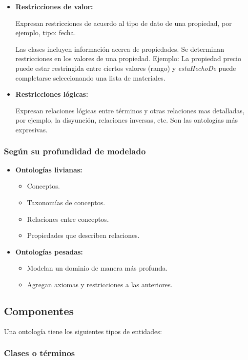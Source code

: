 \documentclass[a4paper,12pt,twoside,final,spanish]{article}
\begin{document}
\begin{itemize}
\item \textbf{Restricciones de valor:}

Expresan restricciones de acuerdo al tipo de dato de una propiedad, por ejemplo, tipo: fecha.

Las clases incluyen información acerca de propiedades. Se determinan restricciones en los valores de una propiedad. Ejemplo: La propiedad precio puede estar restringida entre ciertos valores (rango) y \textit{estaHechoDe} puede completarse seleccionando una lista de materiales.

\item \textbf{Restricciones lógicas:}

Expresan relaciones lógicas entre términos y otras relaciones mas detalladas, por ejemplo, la disyunción, relaciones inversas, etc. Son las ontologías más expresivas.
\end{itemize}

\subsubsection{Según su profundidad de modelado}

\begin{itemize}
\item \textbf{Ontologías livianas:}
	\begin{itemize}
	\item  Conceptos.
	\item Taxonomías de conceptos.
	\item Relaciones entre conceptos.
	\item Propiedades que describen relaciones.
	\end{itemize}

\item \textbf{Ontologías pesadas:}
	\begin{itemize}
	\item Modelan un dominio de manera más profunda.
	\item Agregan axiomas y restricciones a las anteriores.
	\end{itemize}
\end{itemize}

\subsection{Componentes}

Una ontología tiene los siguientes tipos de entidades:

\subsubsection{Clases o términos}
\end{document}
